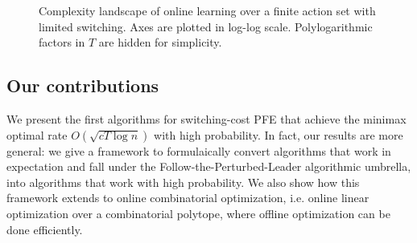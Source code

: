 \documentclass[final,12pt]{colt2018}
\begin{document}
\begin{figure}
\centering     %
{}
\caption{Complexity landscape of online learning over a finite action set with limited switching. Axes are plotted in log-log scale. Polylogarithmic factors in $T$ are hidden for simplicity.}
\label{fig:plots}
\end{figure}

\subsection{Our contributions}\label{subsec:intro-contributions}

We present the first algorithms for switching-cost PFE that achieve the minimax optimal rate $O(\sqrt{cT\log n})$ with high probability. In fact, our results are more general: we give a framework to formulaically convert algorithms that work in expectation and fall under the Follow-the-Perturbed-Leader algorithmic umbrella, into algorithms that work with high probability. We also show how this framework extends to online combinatorial optimization, i.e. online linear optimization over a combinatorial polytope, where offline optimization can be done efficiently. 
\end{document}
